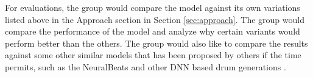 \begin{par}
    \par \hspace{15pt} For evaluations, the group would compare the model against its own variations listed above in the Approach section in Section \ref{sec:approach}. The group would compare the performance of the model and analyze why certain variants would perform better than the others. The group would also like to compare the results against some other similar models that has been proposed by others if the time permits, such as the NeuralBeats \cite{neuralbeats} and other DNN based drum generations \cite{lamb_of_God}. 
\end{par}